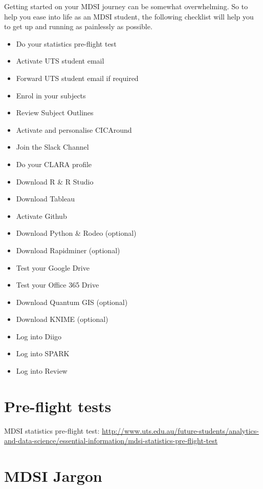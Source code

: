 \documentclass[]{book}
\providecommand{\tightlist}{%
  \setlength{\itemsep}{0pt}\setlength{\parskip}{0pt}}
\theoremstyle{definition}
\theoremstyle{definition}
\theoremstyle{remark}
\begin{document}
Getting started on your MDSI journey can be somewhat overwhelming. So to
help you ease into life as an MDSI student, the following checklist will
help you to get up and running as painlessly as possible.

\begin{itemize}
\tightlist
\item
  Do your statistics pre-flight test
\item
  Activate UTS student email
\item
  Forward UTS student email if required
\item
  Enrol in your subjects
\item
  Review Subject Outlines
\item
  Activate and personalise CICAround
\item
  Join the Slack Channel
\item
  Do your CLARA profile
\item
  Download R \& R Studio
\item
  Download Tableau
\item
  Activate Github
\item
  Download Python \& Rodeo (optional)
\item
  Download Rapidminer (optional)
\item
  Test your Google Drive
\item
  Test your Office 365 Drive
\item
  Download Quantum GIS (optional)
\item
  Download KNIME (optional)
\item
  Log into Diigo
\item
  Log into SPARK
\item
  Log into Review
\end{itemize}

\section{Pre-flight tests}\label{pre-flight-tests}

MDSI statistics pre-flight test:
\url{http://www.uts.edu.au/future-students/analytics-and-data-science/essential-information/mdsi-statistics-pre-flight-test}

\section{MDSI Jargon}\label{mdsi-jargon}
\end{document}
